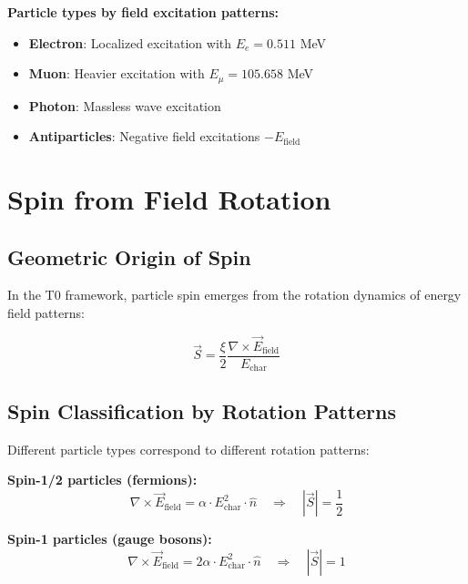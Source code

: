 \documentclass[12pt,a4paper]{report}
\begin{document}
\textbf{Particle types by field excitation patterns:}
\begin{itemize}
	\item \textbf{Electron}: Localized excitation with $E_e = 0.511$ MeV
	\item \textbf{Muon}: Heavier excitation with $E_\mu = 105.658$ MeV  
	\item \textbf{Photon}: Massless wave excitation
	\item \textbf{Antiparticles}: Negative field excitations $-E_{\text{field}}$
\end{itemize}

\section{Spin from Field Rotation}
\label{sec:spin_from_rotation}

\subsection{Geometric Origin of Spin}
\label{subsec:geometric_spin}

In the T0 framework, particle spin emerges from the rotation dynamics of energy field patterns:

\begin{equation}
	\vec{S} = \frac{\xi}{2} \frac{\nabla \times \vec{E}_{\text{field}}}{E_{\text{char}}}
	\label{eq:spin_energy_field}
\end{equation}

\subsection{Spin Classification by Rotation Patterns}
\label{subsec:spin_classification}

Different particle types correspond to different rotation patterns:

\textbf{Spin-1/2 particles (fermions):}
\begin{equation}
	\nabla \times \vec{E}_{\text{field}} = \alpha \cdot E_{\text{char}}^2 \cdot \hat{n} \quad \Rightarrow \quad |\vec{S}| = \frac{1}{2}
\end{equation}

\textbf{Spin-1 particles (gauge bosons):}
\begin{equation}
	\nabla \times \vec{E}_{\text{field}} = 2\alpha \cdot E_{\text{char}}^2 \cdot \hat{n} \quad \Rightarrow \quad |\vec{S}| = 1
\end{equation}
\end{document}
